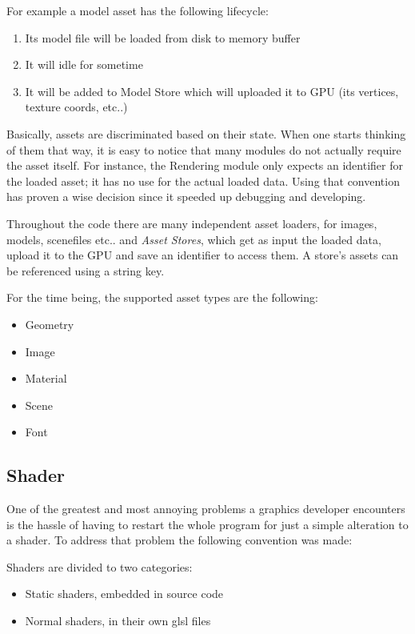 \noindent For example a model asset has the following lifecycle:

\begin{enumerate}
\item Its model file will be loaded from disk to memory buffer
\item It will idle for sometime
\item It will be added to Model Store which will uploaded it to GPU (its vertices, texture coords,
      etc..)
\end{enumerate}

Basically, assets are discriminated based on their state. When one starts thinking of them that
way, it is easy to notice that many modules do not actually require the asset itself. For
instance, the Rendering module only expects an identifier for the loaded asset; it has no use
for the actual loaded data. Using that convention has proven a wise decision since it speeded
up debugging and developing.

Throughout the code there are many independent asset loaders, for images, models, scenefiles etc..
and \textit{Asset Stores}, which get as input the loaded data, upload it to the GPU and save an
identifier to access them. A store's assets can be referenced using a string key.

\noindent For the time being, the supported asset types are the following:

\begin{itemize}
\item Geometry
\item Image
\item Material
\item Scene
\item Font
\end{itemize}

\subsection{Shader}
One of the greatest and most annoying problems a graphics developer encounters is the hassle of
having to restart the whole program for just a simple alteration to a shader. To address that
problem the following convention was made:

\noindent Shaders are divided to two categories:

\begin{itemize}
\item Static shaders, embedded in source code
\item Normal shaders, in their own glsl files
\end{itemize}

